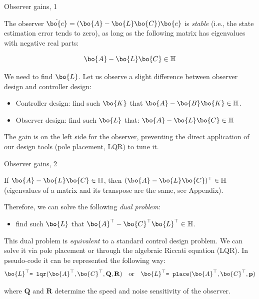 \documentclass{beamer}
\begin{document}
\begin{frame}{Observer gains, 1}
\begin{flushleft}

The observer $\dot {\bo{e} }= (\bo{A} - \bo{L} \bo{C})\bo{e} $ is \emph{stable} (i.e., the state estimation error tends to zero), as long as the following matrix has eigenvalues with negative real parts:

\begin{equation}
\bo{A} - 
\bo{L} \bo{C} \in \mathbb{H}
\end{equation}

We need to find $\bo{L}$. Let us observe a slight difference between observer design and controller design:

\bigskip

\begin{itemize}
    \item Controller design: find such $\bo{K}$ that $\bo{A} - \bo{B} \bo{K} \in \mathbb{H}$.
    \item Observer design: find such $\bo{L}$ that: $\bo{A} - \bo{L} \bo{C} \in \mathbb{H}$
\end{itemize}

\bigskip

The gain is on the left side for the observer, preventing the direct application of our design tools (pole placement, LQR) to tune it.

\end{flushleft}
\end{frame}


\begin{frame}{Observer gains, 2}
\begin{flushleft}

If $\bo{A} - \bo{L} \bo{C}\in \mathbb{H}$, then $(\bo{A} - 
\bo{L} \bo{C})^{\top}\in \mathbb{H}$ (eigenvalues of a matrix and its transpose are the same, see Appendix). 

\bigskip

Therefore, we can solve the following \emph{dual problem}:

\begin{itemize}
    \item find such $\bo{L}$ that $\bo{A}^{\top} - 
\bo{C}^{\top} \bo{L}^{\top} \in \mathbb{H}$.
\end{itemize}

\bigskip

This dual problem is \emph{equivalent} to a standard control design problem. We can solve it via pole placement or through the algebraic Riccati equation (LQR). In pseudo-code it can be represented the following way:
%
\begin{align*}
	\bo{L}^{\top} \texttt{= lqr}(\bo{A}^{\top}, \bo{C}^{\top}, \mathbf Q, \mathbf R)
	\ \ \ \text{or} \ \ \
	\bo{L}^{\top} \texttt{= place}(\bo{A}^{\top}, \bo{C}^{\top}, \mathbf p)
\end{align*}



where $\mathbf Q$ and $\mathbf R$ determine the speed and noise sensitivity of the observer.


\end{flushleft}
\end{frame}
\end{document}
